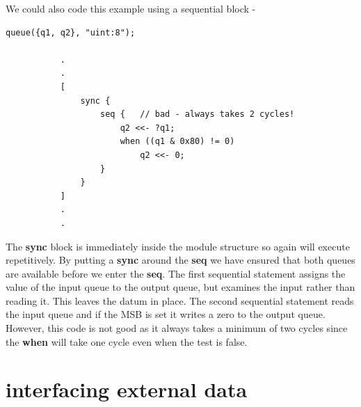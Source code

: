         We could also code this example using a sequential
        block -
        \begin{lstlisting}[gobble=8, language=threepl]
           queue({q1, q2}, "uint:8");

           .
           .
           [
               sync {
                   seq {   // bad - always takes 2 cycles!
                       q2 <<- ?q1;
                       when ((q1 & 0x80) != 0)
                           q2 <<- 0;
                   }
               }
           ]
           .
           .
        \end{lstlisting}
        The {\bf sync} block is immediately inside the module structure so
        again will execute repetitively. By putting a {\bf sync} around the
        {\bf seq} we have ensured that both queues are available before we
        enter the {\bf seq}. The first sequential statement assigns the value
        of the input queue to the output queue, but examines the input rather
        than reading it. This leaves the datum in place. The second
        sequential statement reads the input queue and if the MSB is set it
        writes a zero to the output queue. However, this code is not good as it
        always takes a minimum of two cycles since the {\bf when} will take
        one cycle even when the test is false.


    \section{interfacing external data}

